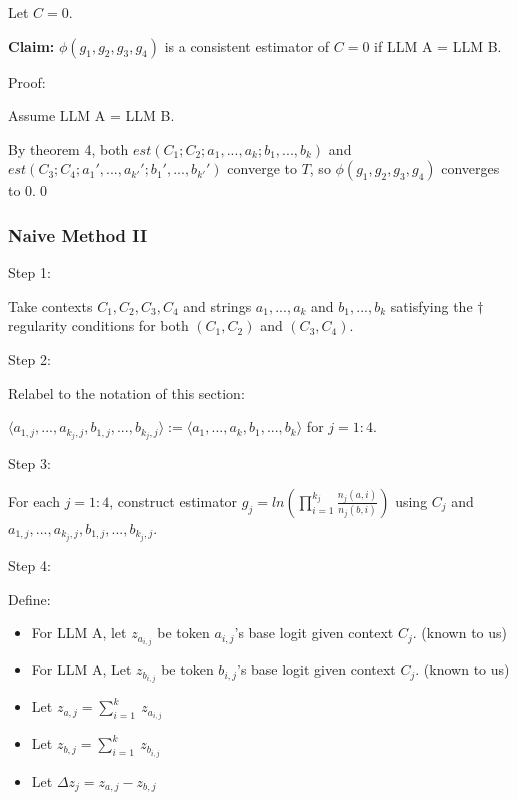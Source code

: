 \documentclass{article}
\begin{document}
Let $\displaystyle C=0$.



\textbf{Claim:} $\displaystyle \phi \left( g_{1} ,g_{2} ,g_{3} ,g_{4}\right)$ is a consistent estimator of $\displaystyle C=0$ if LLM A = LLM B.



Proof:

Assume LLM A = LLM B.

By theorem 4, both $\displaystyle est\left( C_{1} ;C_{2} ;a_{1} ,...,a_{k} ;b_{1} ,...,b_{k}\right)$ and $\displaystyle est\left( C_{3} ;C_{4} ;a_{1} ',...,a_{k'} ';b_{1} ',...,b_{k'} '\right)$ converge to $\displaystyle T$, so $\displaystyle \phi \left( g_{1} ,g_{2} ,g_{3} ,g_{4}\right)$ converges to 0.\qed 



\subsubsection{Naive Method II}

Step 1:

Take contexts $\displaystyle C_{1} ,C_{2} ,C_{3} ,C_{4}$ and strings $\displaystyle a_{1} ,...,a_{k}$ and $\displaystyle b_{1} ,...,b_{k}$ satisfying the $\displaystyle \dagger $ regularity conditions for both $\displaystyle \left( C_{1} ,C_{2}\right)$ and $\displaystyle \left( C_{3} ,C_{4}\right)$.



Step 2:

Relabel to the notation of this section:

$\displaystyle \langle a_{1,j} ,...,a_{k_{j} ,j} ,b_{1,j} ,...,b_{k_{j} ,j} \rangle :=\langle a_{1} ,...,a_{k} ,b_{1} ,...,b_{k} \rangle $ for $\displaystyle j=1:4$.



Step 3:

For each $\displaystyle j=1:4$, construct estimator $\displaystyle g_{j} =ln\left(\prod _{i=1}^{k_{j}}\frac{n_{j}\left( a,i\right)}{n_{j}\left( b,i\right)}\right)$ using $\displaystyle C_{j}$ and $\displaystyle a_{1,j} ,...,a_{k_{j} ,j} ,b_{1,j} ,...,b_{k_{j} ,j}$.



Step 4:

Define:
\begin{itemize}
\item For LLM A, let $\displaystyle z_{a_{i,j}}$ be token $\displaystyle a_{i,j}$'s base logit given context $\displaystyle C_{j}$. (known to us)
\item For LLM A, Let $\displaystyle z_{b_{i,j}}$ be token $\displaystyle b_{i,j}$'s base logit given context $\displaystyle C_{j}$. (known to us)
\item Let $\displaystyle z_{a,j} =\sum _{i=1}^{k} \ z_{a_{i,j}}$
\item Let $\displaystyle z_{b,j} =\sum _{i=1}^{k} \ z_{b_{i,j}}$
\item Let $\displaystyle \Delta z_{j} =z_{a,j} -z_{b,j}$
\end{itemize}
\end{document}
